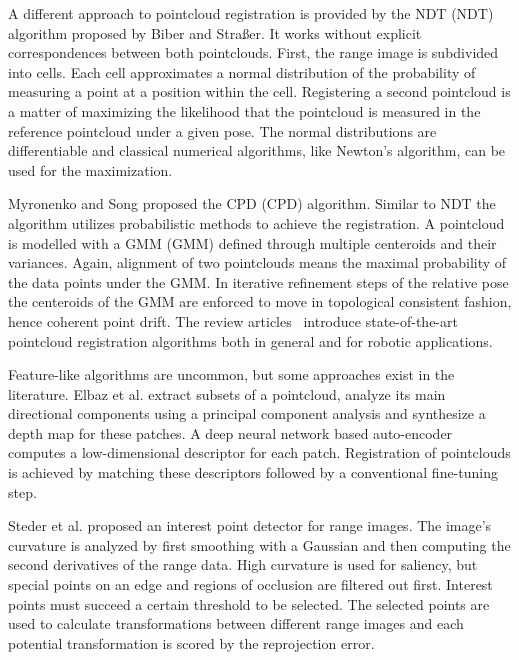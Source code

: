 A different approach to pointcloud registration is provided by the \acrlong{NDT} (\acrshort{NDT}) algorithm proposed by Biber and Straßer\cite{biber_iros2003}.
It works without explicit correspondences between both pointclouds.
First, the range image is subdivided into cells.
Each cell approximates a normal distribution of the probability of measuring a point at a position within the cell.
Registering a second pointcloud is a matter of maximizing the likelihood that the pointcloud is measured in the reference pointcloud under a given pose.
The normal distributions are differentiable and classical numerical algorithms, like Newton's algorithm, can be used for the maximization.

Myronenko and Song\cite{myronenko_ieee2010} proposed the \acrlong{CPD} (\acrshort{CPD}) algorithm.
Similar to \acrshort{NDT} the algorithm utilizes probabilistic methods to achieve the registration.
A pointcloud is modelled with a \acrlong{GMM} (\acrshort{GMM}) defined through multiple centeroids and their variances.
Again, alignment of two pointclouds means the maximal probability of the data points under the \acrshort{GMM}.
In iterative refinement steps of the relative pose the centeroids of the \acrshort{GMM} are enforced to move in topological consistent fashion, hence coherent point drift.
The review articles~\cite{bellekens_ambient2014,pomerleau_2015} introduce state-of-the-art pointcloud registration algorithms both in general and for robotic applications.

Feature-like algorithms are uncommon, but some approaches exist in the literature.
Elbaz et al.\cite{elbaz_cvpr2017} extract subsets of a pointcloud, analyze its main directional components using a principal component analysis and synthesize a depth map for these patches.
A deep neural network based auto-encoder computes a low-dimensional descriptor for each patch.
Registration of pointclouds is achieved by matching these descriptors followed by a conventional fine-tuning step.

Steder et al.\cite{steder_robot2010} proposed an interest point detector for range images.
The image's curvature is analyzed by first smoothing with a Gaussian and then computing the second derivatives of the range data.
High curvature is used for saliency, but special points on an edge and regions of occlusion are filtered out first.
Interest points must succeed a certain threshold to be selected.
The selected points are used to calculate transformations between different range images and each potential transformation is scored by the reprojection error.

